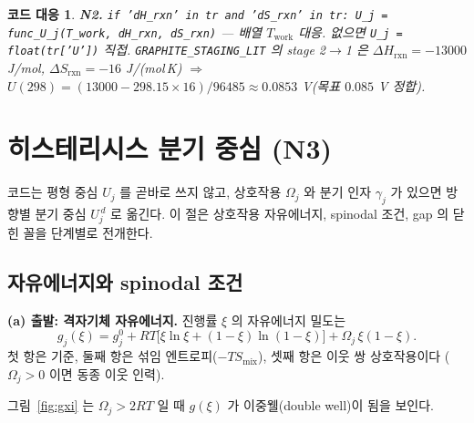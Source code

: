 \documentclass[11pt,a4paper]{article}
\newtheorem*{codebox}{코드 대응}
\newcommand{\rxn}{\mathrm{rxn}}
\newcommand{\work}{\mathrm{work}}
\newcommand{\code}[1]{\texttt{#1}}
\begin{document}
\begin{codebox}
\textbf{N2.} \code{if 'dH\_rxn' in tr and 'dS\_rxn' in tr: U\_j = func\_U\_j(T\_work, dH\_rxn, dS\_rxn)}
— 배열 $T_\work$ 대응. 없으면 \code{U\_j = float(tr['U'])} 직접. \code{GRAPHITE\_STAGING\_LIT} 의 stage 2$\to$1 은
$\Delta H_\rxn=-13000$ J/mol, $\Delta S_\rxn=-16$ J/(mol\,K) $\Rightarrow$ $U(298)=(13000-298.15\times16)/96485
\approx0.0853$ V(목표 $0.085$ V 정합).
\end{codebox}

\section{히스테리시스 분기 중심 (N3)}\label{sec:hys}
코드는 평형 중심 $U_j$ 를 곧바로 쓰지 않고, 상호작용 $\Omega_j$ 와 분기 인자 $\gamma_j$ 가 있으면 방향별 분기 중심
$U_j^{\,d}$ 로 옮긴다. 이 절은 상호작용 자유에너지, spinodal 조건, gap 의 닫힌 꼴을 단계별로 전개한다.

\subsection{자유에너지와 spinodal 조건}

\textbf{(a) 출발: 격자기체 자유에너지.} 진행률 $\xi$ 의 자유에너지 밀도는
\begin{equation}
g_j(\xi)=g_j^0+RT\big[\xi\ln\xi+(1-\xi)\ln(1-\xi)\big]+\Omega_j\,\xi(1-\xi).
\label{eq:gxi}
\end{equation}
첫 항은 기준, 둘째 항은 섞임 엔트로피($-TS_\mathrm{mix}$), 셋째 항은 이웃 쌍 상호작용이다
($\Omega_j>0$ 이면 동종 이웃 인력).

그림~\ref{fig:gxi} 는 $\Omega_j>2RT$ 일 때 $g(\xi)$ 가 이중웰(double well)이 됨을 보인다.
\end{document}
